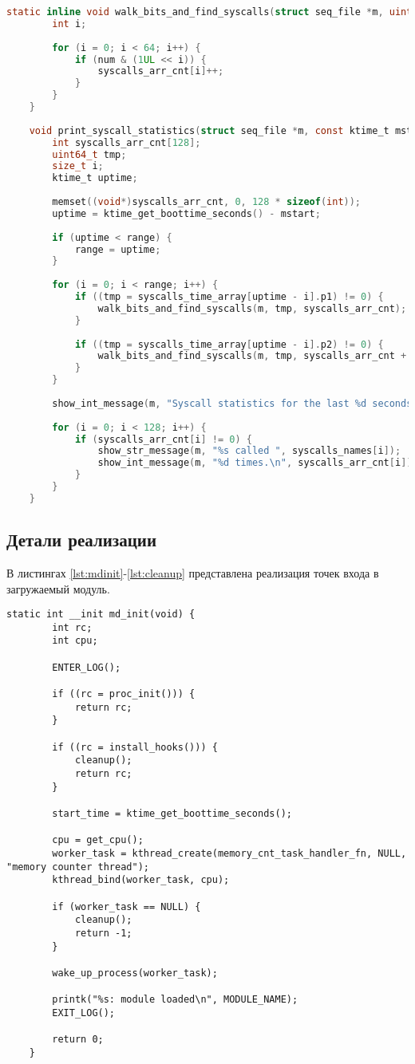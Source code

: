 \begin{lstlisting}[label=lst:syscall_proc, caption=Реализация функций агрегации данных о системных вызовах, language=c]
	static inline void walk_bits_and_find_syscalls(struct seq_file *m, uint64_t num, int syscalls_arr_cnt[]) {
		int i;
		
		for (i = 0; i < 64; i++) {
			if (num & (1UL << i)) {
				syscalls_arr_cnt[i]++;
			}
		}
	}
	
	void print_syscall_statistics(struct seq_file *m, const ktime_t mstart, ktime_t range) {
		int syscalls_arr_cnt[128];
		uint64_t tmp;
		size_t i;
		ktime_t uptime;
		
		memset((void*)syscalls_arr_cnt, 0, 128 * sizeof(int));
		uptime = ktime_get_boottime_seconds() - mstart;
		
		if (uptime < range) {
			range = uptime;
		}
		
		for (i = 0; i < range; i++) {
			if ((tmp = syscalls_time_array[uptime - i].p1) != 0) {
				walk_bits_and_find_syscalls(m, tmp, syscalls_arr_cnt);
			}
			
			if ((tmp = syscalls_time_array[uptime - i].p2) != 0) {
				walk_bits_and_find_syscalls(m, tmp, syscalls_arr_cnt + 64);
			}
		}
		
		show_int_message(m, "Syscall statistics for the last %d seconds.\n\n", range);
		
		for (i = 0; i < 128; i++) {
			if (syscalls_arr_cnt[i] != 0) {
				show_str_message(m, "%s called ", syscalls_names[i]);
				show_int_message(m, "%d times.\n", syscalls_arr_cnt[i]);
			}
		}
	}
\end{lstlisting}

\subsection{Детали реализации}

В листингах \ref{lst:mdinit}-\ref{lst:cleanup} представлена реализация точек входа в загружаемый модуль.

\begin{lstlisting}[label={lst:mdinit}, caption={функция инициализации модуля}]
	static int __init md_init(void) {
		int rc;
		int cpu;
		
		ENTER_LOG();
		
		if ((rc = proc_init())) {
			return rc;
		}
		
		if ((rc = install_hooks())) {
			cleanup();
			return rc;
		}
		
		start_time = ktime_get_boottime_seconds();
		
		cpu = get_cpu();
		worker_task = kthread_create(memory_cnt_task_handler_fn, NULL, "memory counter thread");
		kthread_bind(worker_task, cpu);
		
		if (worker_task == NULL) {
			cleanup();
			return -1;
		}
		
		wake_up_process(worker_task);
		
		printk("%s: module loaded\n", MODULE_NAME);
		EXIT_LOG();
		
		return 0;
	}
\end{lstlisting}

